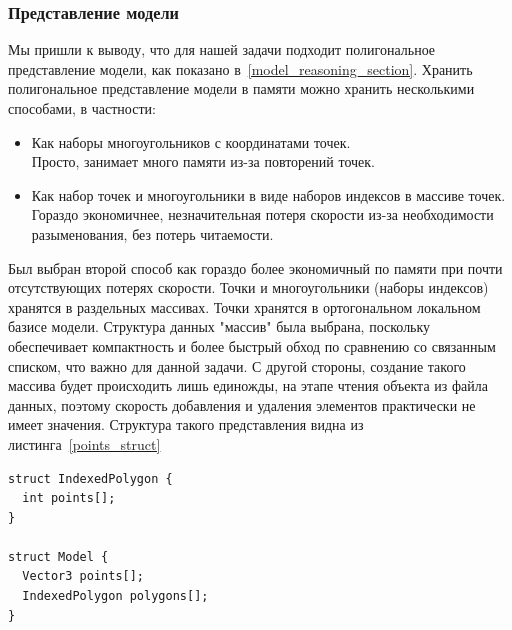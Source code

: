 \documentclass[a4paper,12pt]{report}
\numberwithin{equation}{section}
\begin{document}
\subsubsection{Представление модели}
Мы пришли к выводу, что для нашей задачи подходит полигональное представление модели, как показано в~\ref{model_reasoning_section}. Хранить полигональное представление модели в памяти можно хранить несколькими способами, в частности:
\begin{itemize}
\item Как наборы многоугольников с координатами точек. \\
Просто, занимает много памяти из-за повторений точек.
\item Как набор точек и многоугольники в виде наборов индексов в массиве точек. \cite{richard2005opengl} \\
Гораздо экономичнее, незначительная потеря скорости из-за необходимости разыменования, без потерь читаемости.
\end{itemize}
Был выбран второй способ как гораздо более экономичный по памяти при почти отсутствующих потерях скорости. Точки и многоугольники (наборы индексов) хранятся в раздельных массивах. Точки хранятся в ортогональном локальном базисе модели. Структура данных "массив" была выбрана, поскольку обеспечивает компактность и более быстрый обход по сравнению со связанным списком, что важно для данной задачи. С другой стороны, создание такого массива будет происходить лишь единожды, на этапе чтения объекта из файла данных, поэтому скорость добавления и удаления элементов практически не имеет значения. Структура такого представления видна из листинга~\ref{points_struct}

\begin{lstlisting}[float=p,caption={Структуры данных ``Модель'' и ``Полигон''},label=points_struct]
struct IndexedPolygon {
  int points[];
}

struct Model {
  Vector3 points[];
  IndexedPolygon polygons[];
}
\end{lstlisting}
\end{document}
